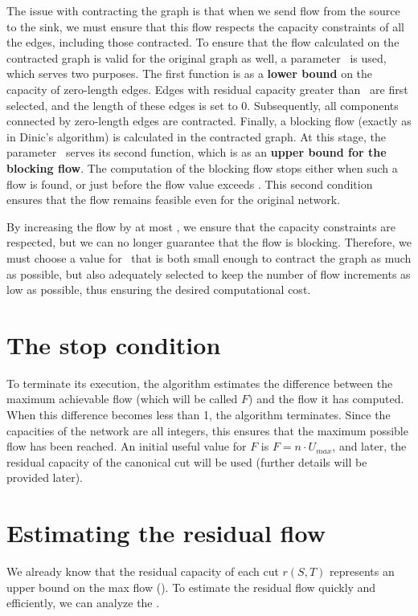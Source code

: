     The issue with contracting the graph is that when we send flow from the source to the sink, we must ensure that this flow respects the capacity constraints of all the edges, including those contracted.  
    To ensure that the flow calculated on the contracted graph is valid for the original graph as well, a parameter \dlt\ is used, which serves two purposes. The first function is as a \textbf{lower bound} on the capacity of zero-length edges.  
    Edges with residual capacity greater than \dlt\ are first selected, and the length of these edges is set to 0.  
    Subsequently, all components connected by zero-length edges are contracted.  
    Finally, a blocking flow (exactly as in Dinic's algorithm) is calculated in the contracted graph.  
    At this stage, the parameter \dlt\ serves its second function, which is as an \textbf{upper bound for the blocking flow}. The computation of the blocking flow stops either when such a flow is found, or just before the flow value exceeds \dlt. This second condition ensures that the flow remains feasible even for the original network.

    By increasing the flow by at most \dlt, we ensure that the capacity constraints are respected, but we can no longer guarantee that the flow is blocking.  
    Therefore, we must choose a value for \dlt\ that is both small enough to contract the graph as much as possible, but also adequately selected to keep the number of flow increments as low as possible, thus ensuring the desired computational cost.

\section{The stop condition}
    To terminate its execution, the algorithm estimates the difference between the maximum achievable flow (which will be called $F$) and the flow it has computed.
    When this difference becomes less than 1, the algorithm terminates.
    Since the capacities of the network are all integers, this ensures that the maximum possible flow has been reached.
    An initial useful value for $F$ is $F=n\cdot U_{max}$, and later, the residual capacity of the canonical cut will be used (further details will be provided later).

\section{Estimating the residual flow}
    We already know that the residual capacity of each cut $r(S,T)$ represents an upper bound on the max flow ().
    To estimate the residual flow quickly and efficiently, we can analyze the .


